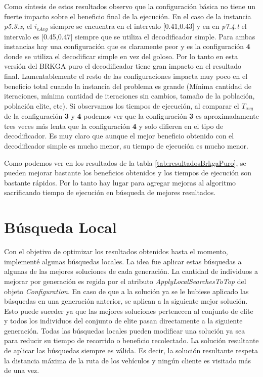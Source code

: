 \bigskip

Como síntesis de estos resultados observo que la configuración básica no tiene un fuerte impacto sobre el beneficio final de la ejecución. En el caso de la instancia \textit{p5.3.x}, el $i_{eAvg}$ siempre se encuentra en el intervalo [0.41,0.43] y en en \textit{p7.4.t} el intervalo es [0.45,0.47] siempre que se utiliza el decodificador simple. Para ambas instancias hay una configuración que es claramente peor y es la configuración \textbf{4} donde se utiliza el decodificar simple en vez del goloso. Por lo tanto en esta versión del BRKGA puro el decodificador tiene gran impacto en el resultado final. Lamentablemente el resto de las configuraciones impacta muy poco en el beneficio total cuando la instancia del problema es grande (Mínima cantidad de iteraciones, mínima cantidad de iteraciones sin cambios, tamaño de la población, población elite, etc). Si observamos los tiempos de ejecución, al comparar el $T_{avg}$ de la configuración \textbf{3} y \textbf{4} podemos ver que la configuración \textbf{3} es aproximadamente tres veces más lenta que la configuración \textbf{4} y solo difieren en el tipo de decodificador. Es muy claro que aunque el mejor beneficio obtenido con el decodificador simple es mucho menor, su tiempo de ejecución es mucho menor.

\bigskip

Como podemos ver en los resultados de la tabla \ref{tab:resultadosBrkgaPuro}, se pueden mejorar bastante los beneficios obtenidos y los tiempos de ejecución son bastante rápidos. Por lo tanto hay lugar para agregar mejoras al algoritmo sacrificando tiempo de ejecución en búsqueda de mejores resultados.

\bigskip

\section{Búsqueda Local}

Con el objetivo de optimizar los resultados obtenidos hasta el momento, implementé algunas búsquedas locales. La idea fue aplicar estas búsquedas a algunas de las mejores soluciones de cada generación. La cantidad de individuos a mejorar por generación es regida por el atributo \textit{ApplyLocalSearchesToTop} del objeto \textit{Configuration}. En caso de que a la solución ya se le hubiese aplicado las búsquedas en una generación anterior, se aplican a la siguiente mejor solución. Esto puede suceder ya que las mejores soluciones pertenecen al conjunto de elite y todos los individuos del conjunto de elite pasan directamente a la siguiente generación. Todas las búsquedas locales pueden modificar una solución ya sea para reducir su tiempo de recorrido o beneficio recolectado. La solución resultante de aplicar las búsquedas siempre es válida. Es decir, la solución resultante respeta la distancia máxima de la ruta de los vehículos y ningún cliente es visitado más de una vez. 

